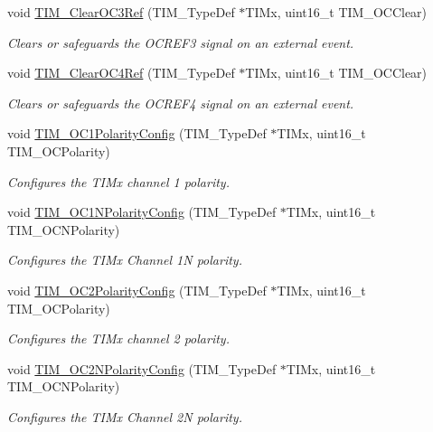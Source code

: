 \begin{DoxyCompactItemize}
void \hyperlink{group___t_i_m_ga0bd9476a14bd346c319945ec4fa2bc67}{T\-I\-M\-\_\-\-Clear\-O\-C3\-Ref} (T\-I\-M\-\_\-\-Type\-Def $\ast$T\-I\-Mx, uint16\-\_\-t T\-I\-M\-\_\-\-O\-C\-Clear)
\begin{DoxyCompactList}\small\item\em Clears or safeguards the O\-C\-R\-E\-F3 signal on an external event. \end{DoxyCompactList}\item 
void \hyperlink{group___t_i_m_gaeee5fa66b26e7c6f71850272dc3028f3}{T\-I\-M\-\_\-\-Clear\-O\-C4\-Ref} (T\-I\-M\-\_\-\-Type\-Def $\ast$T\-I\-Mx, uint16\-\_\-t T\-I\-M\-\_\-\-O\-C\-Clear)
\begin{DoxyCompactList}\small\item\em Clears or safeguards the O\-C\-R\-E\-F4 signal on an external event. \end{DoxyCompactList}\item 
void \hyperlink{group___t_i_m_ga03878f78163485c8a3508cff2111c297}{T\-I\-M\-\_\-\-O\-C1\-Polarity\-Config} (T\-I\-M\-\_\-\-Type\-Def $\ast$T\-I\-Mx, uint16\-\_\-t T\-I\-M\-\_\-\-O\-C\-Polarity)
\begin{DoxyCompactList}\small\item\em Configures the T\-I\-Mx channel 1 polarity. \end{DoxyCompactList}\item 
void \hyperlink{group___t_i_m_ga3cb91578e7dd34ea7d09862482960445}{T\-I\-M\-\_\-\-O\-C1\-N\-Polarity\-Config} (T\-I\-M\-\_\-\-Type\-Def $\ast$T\-I\-Mx, uint16\-\_\-t T\-I\-M\-\_\-\-O\-C\-N\-Polarity)
\begin{DoxyCompactList}\small\item\em Configures the T\-I\-Mx Channel 1\-N polarity. \end{DoxyCompactList}\item 
void \hyperlink{group___t_i_m_ga6831cacaac1ef50291af94db94450797}{T\-I\-M\-\_\-\-O\-C2\-Polarity\-Config} (T\-I\-M\-\_\-\-Type\-Def $\ast$T\-I\-Mx, uint16\-\_\-t T\-I\-M\-\_\-\-O\-C\-Polarity)
\begin{DoxyCompactList}\small\item\em Configures the T\-I\-Mx channel 2 polarity. \end{DoxyCompactList}\item 
void \hyperlink{group___t_i_m_ga2fa6ea3a89f446b52b4e699272b70cad}{T\-I\-M\-\_\-\-O\-C2\-N\-Polarity\-Config} (T\-I\-M\-\_\-\-Type\-Def $\ast$T\-I\-Mx, uint16\-\_\-t T\-I\-M\-\_\-\-O\-C\-N\-Polarity)
\begin{DoxyCompactList}\small\item\em Configures the T\-I\-Mx Channel 2\-N polarity. \end{DoxyCompactList}\item 

\end{DoxyCompactItemize}
